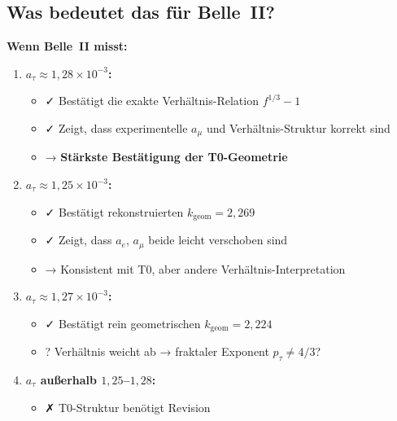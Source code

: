 	\subsection{Was bedeutet das für Belle~II?}
	
	\textbf{Wenn Belle~II misst:}
	
	\begin{enumerate}
		\item \textbf{$a_\tau \approx 1{,}28 \times 10^{-3}$:}
		\begin{itemize}
			\item ✓ Bestätigt die exakte Verhältnis-Relation $f^{1/3} - 1$
			\item ✓ Zeigt, dass experimentelle $a_\mu$ und Verhältnis-Struktur korrekt sind
			\item → \textbf{Stärkste Bestätigung der T0-Geometrie}
		\end{itemize}
		
		\item \textbf{$a_\tau \approx 1{,}25 \times 10^{-3}$:}
		\begin{itemize}
			\item ✓ Bestätigt rekonstruierten $k_{\text{geom}} = 2{,}269$
			\item ✓ Zeigt, dass $a_e$, $a_\mu$ beide leicht verschoben sind
			\item → Konsistent mit T0, aber andere Verhältnis-Interpretation
		\end{itemize}
		
		\item \textbf{$a_\tau \approx 1{,}27 \times 10^{-3}$:}
		\begin{itemize}
			\item ✓ Bestätigt rein geometrischen $k_{\text{geom}} = 2{,}224$
			\item ? Verhältnis weicht ab → fraktaler Exponent $p_\tau \neq 4/3$?
		\end{itemize}
		
		\item \textbf{$a_\tau$ außerhalb $1{,}25$--$1{,}28$:}
		\begin{itemize}
			\item ✗ T0-Struktur benötigt Revision
		\end{itemize}
	\end{enumerate}
	
